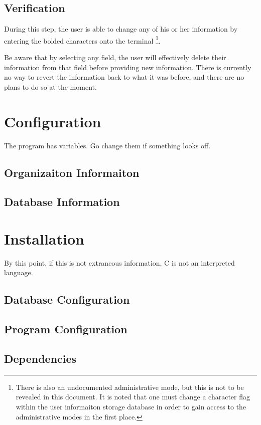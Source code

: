 \documentclass[12pt]{article}
\begin{document}
\subsection{Verification}
During this step, the user is able to change any of his or her information by
entering the bolded characters onto the terminal
\footnote{There is also an undocumented administrative mode, but this is not
to be revealed in this document.  It is noted that one must change a
character flag within the user informaiton storage database in order to gain
access to the administrative modes in the first place.}.

Be aware that by selecting any field, the user will effectively delete their
information from that field before providing new information.
There is currently no way to revert the information back to what it was
before, and there are no plans to do so at the moment.

\section{Configuration}
The program has variables.  Go change them if something looks off.

\subsection{Organizaiton Informaiton}

\subsection{Database Information}

\section{Installation}
By this point, if this is not extraneous information, C is not an interpreted
language.
\subsection{Database Configuration}

\subsection{Program Configuration}

\subsection{Dependencies}
\end{document}
